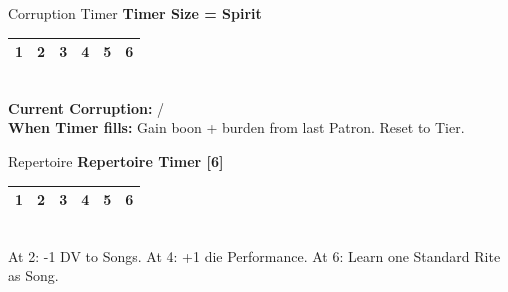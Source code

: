 \documentclass[10pt]{article}
\begin{document}
\begin{minipage}[t]{0.48\linewidth}
    \vspace{0.5em}
    
    \begin{charbox}{Corruption Timer }
        \textbf{Timer Size = Spirit} \underline{\hspace{1.5cm}}\\
        \begin{tabular}{|p{1cm}|p{1cm}|p{1cm}|p{1cm}|p{1cm}|p{1cm}|}
            \hline
            1 & 2 & 3 & 4 & 5 & 6 \\
            \hline
        \end{tabular}\\
        \textbf{Current Corruption:} \underline{\hspace{1cm}} / \underline{\hspace{1.5cm}}\\
        \textbf{When Timer fills:} Gain boon + burden from last Patron. Reset to Tier.
    \end{charbox}
    
    \vspace{0.5em}
    
    \begin{charbox}{Repertoire}
        \textbf{Repertoire Timer [6]}\\
        \begin{tabular}{|p{1cm}|p{1cm}|p{1cm}|p{1cm}|p{1cm}|p{1cm}|}
            \hline
            1 & 2 & 3 & 4 & 5 & 6 \\
            \hline
        \end{tabular}\\
        At 2: -1 DV to Songs. At 4: +1 die Performance. At 6: Learn one Standard Rite as Song.
    \end{charbox}
\end{minipage}
\hfill
\end{document}
